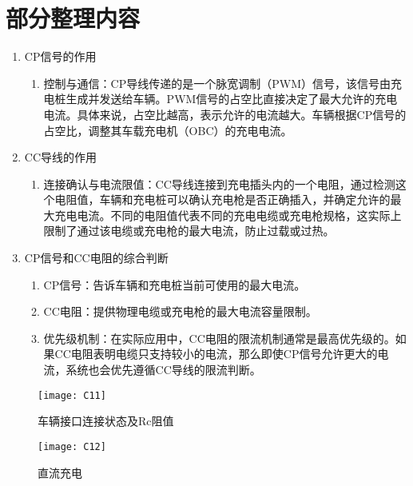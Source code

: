\section{部分整理内容}
    \begin{enumerate}
        \item  CP信号的作用
            \begin{enumerate}
                \item  控制与通信：CP导线传递的是一个脉宽调制（PWM）信号，该信号由充电桩生成并发送给车辆。PWM信号的占空比直接决定了最大允许的充电电流。具体来说，占空比越高，表示允许的电流越大。车辆根据CP信号的占空比，调整其车载充电机（OBC）的充电电流。
            \end{enumerate}
        \item  CC导线的作用
            \begin{enumerate}
                \item 连接确认与电流限值：CC导线连接到充电插头内的一个电阻，通过检测这个电阻值，车辆和充电桩可以确认充电枪是否正确插入，并确定允许的最大充电电流。不同的电阻值代表不同的充电电缆或充电枪规格，这实际上限制了通过该电缆或充电枪的最大电流，防止过载或过热。  
            \end{enumerate}
        \item CP信号和CC电阻的综合判断
            \begin{enumerate}
                \item CP信号：告诉车辆和充电桩当前可使用的最大电流。
                \item CC电阻：提供物理电缆或充电枪的最大电流容量限制。
                \item 优先级机制：在实际应用中，CC电阻的限流机制通常是最高优先级的。如果CC电阻表明电缆只支持较小的电流，那么即使CP信号允许更大的电流，系统也会优先遵循CC导线的限流判断。
            \end{enumerate}
    \end{enumerate}

    \begin{figure}[!htbp]
        \centering
        \texttt{[image: C11]}
        \caption{车辆接口连接状态及Rc阻值\cite{GB18487_1}}
        \label{fig:C11}
    \end{figure}

    \begin{figure}[!htbp]
        \centering
        \texttt{[image: C12]}
        \caption{直流充电\cite{GB18487_1}}
        \label{fig:C12}
    \end{figure}

